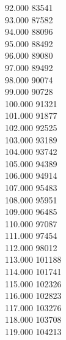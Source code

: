 { 92.000	83541 \\
 93.000	87582 \\
 94.000	88096 \\
 95.000	88492 \\
 96.000	89080 \\
 97.000	89492 \\
 98.000	90074 \\
 99.000	90728 \\
 100.000	91321 \\
 101.000	91877 \\
 102.000	92525 \\
 103.000	93189 \\
 104.000	93742 \\
 105.000	94389 \\
 106.000	94914 \\
 107.000	95483 \\
 108.000	95951 \\
 109.000	96485 \\
 110.000	97087 \\
 111.000	97454 \\
 112.000	98012 \\
 113.000	101188 \\
 114.000	101741 \\
 115.000	102326 \\
 116.000	102823 \\
 117.000	103276 \\
 118.000	103708 \\
 119.000	104213 \\
}
